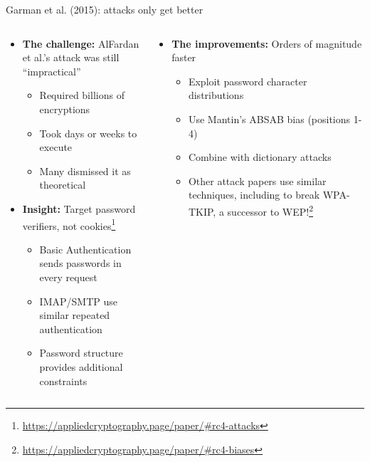 \documentclass[aspectratio=169, lualatex, handout]{beamer}
\begin{document}
\begin{frame}{Garman et al. (2015): attacks only get better}
	\begin{columns}[c]
		\begin{column}{0.5\textwidth}
			\begin{itemize}[<+->]
				\item \textbf{The challenge:} AlFardan et al.'s attack was still ``impractical''
				      \begin{itemize}[<+->]
					      \item Required billions of encryptions
					      \item Took days or weeks to execute
					      \item Many dismissed it as theoretical
				      \end{itemize}
				\item \textbf{Insight:} Target password verifiers, not cookies\footnote{\url{https://appliedcryptography.page/paper/\#rc4-attacks}}
				      \begin{itemize}[<+->]
					      \item Basic Authentication sends passwords in every request
					      \item IMAP/SMTP use similar repeated authentication
					      \item Password structure provides additional constraints
				      \end{itemize}
			\end{itemize}
		\end{column}
		\begin{column}{0.5\textwidth}
			\begin{itemize}[<+->]
				\item \textbf{The improvements:} Orders of magnitude faster
				      \begin{itemize}[<+->]
					      \item Exploit password character distributions
					      \item Use Mantin's ABSAB bias (positions 1-4)
					      \item Combine with dictionary attacks
					      \item Other attack papers use similar techniques, including to break WPA-TKIP, a successor to WEP!\footnote{\url{https://appliedcryptography.page/paper/\#rc4-biases}}
				      \end{itemize}
			\end{itemize}
		\end{column}
	\end{columns}
\end{frame}
\end{document}
